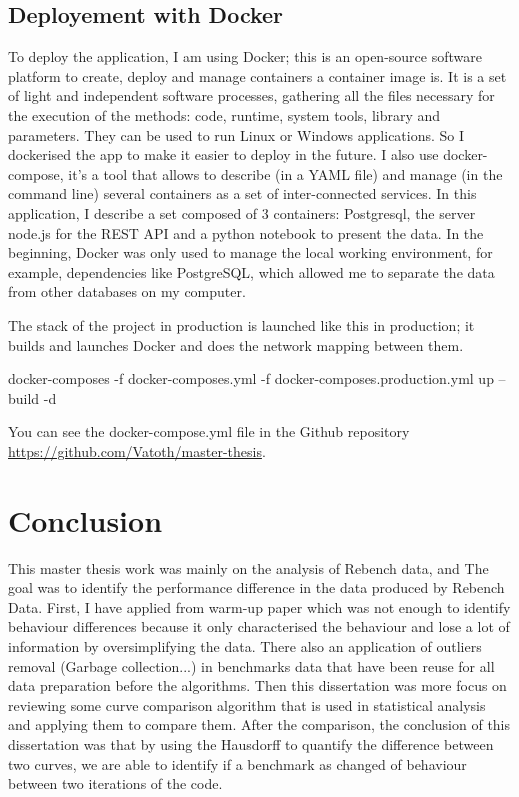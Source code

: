 \documentclass{article}
\begin{document}
\subsection{Deployement with Docker}

To deploy the application, I am using Docker; this is an open-source software platform to create, deploy and manage containers a container image is. It is a set of light and independent software processes, gathering all the files necessary for the execution of the methods: code, runtime, system tools, library and parameters. They can be used to run Linux or Windows applications. So I dockerised the app to make it easier to deploy in the future. I also use docker-compose, it's a tool that allows to describe (in a YAML file) and manage (in the command line) several containers as a set of inter-connected services. In this application, I describe a set composed of 3 containers: Postgresql, the server node.js for the REST API and a python notebook to present the data. In the beginning, Docker was only used to manage the local working environment, for example, dependencies like PostgreSQL, which allowed me to separate the data from other databases on my computer.

The stack of the project in production is launched like this in production; it builds and launches Docker and does the network mapping between them.

docker-composes -f docker-composes.yml -f docker-composes.production.yml up --build -d

You can see the docker-compose.yml file in the Github repository \url{https://github.com/Vatoth/master-thesis}. 



\section{Conclusion}


This master thesis work was mainly on the analysis of Rebench data, and The goal was to identify the performance difference in the data produced by Rebench Data. First, I have applied from \citep{barrett2017virtual} warm-up paper which was not enough to identify behaviour differences because it only characterised the behaviour and lose a lot of information by oversimplifying the data. There also an application of outliers removal (Garbage collection...) in benchmarks data that have been reuse for all data preparation before the algorithms.  Then this dissertation was more focus on reviewing some curve comparison algorithm that is used in statistical analysis and applying them to compare them. After the comparison, the conclusion of this dissertation was that by using the Hausdorff to quantify the difference between two curves, we are able to identify if a benchmark as changed of behaviour between two iterations of the code.
\end{document}
